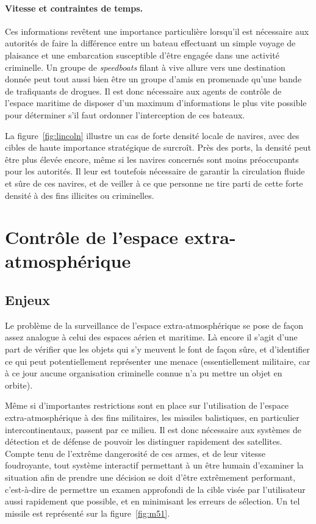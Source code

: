 	\paragraph{Vitesse et contraintes de temps.}
	Ces informations revêtent une importance particulière lorsqu'il est nécessaire aux autorités de faire la différence entre un bateau effectuant un simple voyage de plaisance et une embarcation susceptible d'être engagée dans une activité criminelle. Un groupe de \emph{speedboats} filant à vive allure vers une destination donnée peut tout aussi bien être un groupe d'amis en promenade qu'une bande de trafiquants de drogues. Il est donc nécessaire aux agents de contrôle de l'espace maritime de disposer d'un maximum d'informations le plus vite possible pour déterminer s'il faut ordonner l'interception de ces bateaux.
	
	La figure~\ref{fig:lincoln} illustre un cas de forte densité locale de navires, avec des cibles de haute importance stratégique de surcroît. Près des ports, la densité peut être plus élevée encore, même si les navires concernés sont moins préoccupants pour les autorités. Il leur est toutefois nécessaire de garantir la circulation fluide et sûre de ces navires, et de veiller à ce que personne ne tire parti de cette forte densité à des fins illicites ou criminelles.
	
	\section{Contrôle de l'espace extra-atmosphérique}
	\subsection{Enjeux}
	Le problème de la surveillance de l'espace extra-atmosphérique se pose de façon assez analogue à celui des espaces aérien et maritime. Là encore il s'agit d'une part de vérifier que les objets qui s'y meuvent le font de façon sûre, et d'identifier ce qui peut potentiellement représenter une menace (essentiellement militaire, car à ce jour aucune organisation criminelle connue n'a pu mettre un objet en orbite).
	
	Même si d'importantes restrictions sont en place sur l'utilisation de l'espace extra-atmosphérique à des fins militaires\footnotemark, les missiles balistiques, en particulier intercontinentaux, passent par ce milieu. Il est donc nécessaire aux systèmes de détection et de défense de pouvoir les distinguer rapidement des satellites. Compte tenu de l'extrême dangerosité de ces armes, et de leur vitesse foudroyante, tout système interactif permettant à un être humain d'examiner la situation afin de prendre une décision se doit d'être extrêmement performant, c'est-à-dire de permettre un examen approfondi de la cible visée par l'utilisateur aussi rapidement que possible, et en minimisant les erreurs de sélection. Un tel missile est représenté sur la figure~\ref{fig:m51}.
	
